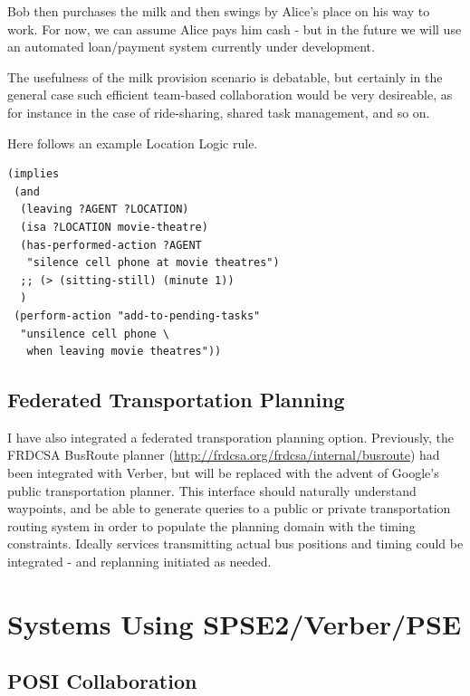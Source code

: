 \documentclass[letterpaper]{article}
\begin{document}
Bob then purchases the milk and then swings by Alice's place on his
way to work.  For now, we can assume Alice pays him cash - but in the
future we will use an automated loan/payment system currently under
development.

The usefulness of the milk provision scenario is debatable, but
certainly in the general case such efficient team-based collaboration
would be very desireable, as for instance in the case of ride-sharing,
shared task management, and so on.

Here follows an example Location Logic rule.

\begin{footnotesize}
\begin{verbatim}
(implies
 (and
  (leaving ?AGENT ?LOCATION)
  (isa ?LOCATION movie-theatre)
  (has-performed-action ?AGENT
   "silence cell phone at movie theatres")
  ;; (> (sitting-still) (minute 1))
  )
 (perform-action "add-to-pending-tasks"
  "unsilence cell phone \
   when leaving movie theatres"))
\end{verbatim}
\end{footnotesize}

\subsection{Federated Transportation Planning}

\noindent I have also integrated a federated transporation planning
option.  Previously, the FRDCSA BusRoute planner
(\url{http://frdcsa.org/frdcsa/internal/busroute}) had been integrated
with Verber, but will be replaced with the advent of Google's public
transportation planner.  This interface should naturally understand
waypoints, and be able to generate queries to a public or private
transportation routing system in order to populate the planning domain
with the timing constraints.  Ideally services transmitting actual bus
positions and timing could be integrated - and replanning initiated as
needed.

\section{Systems Using SPSE2/Verber/PSE}

\subsection{POSI Collaboration}
\end{document}
